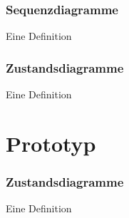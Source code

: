 \documentclass{beamer}
\begin{document}
\begin{frame} %
  \frametitle{Sequenzdiagramme} %
  \begin{Definition} %
    Eine Definition
  \end{Definition}
\end{frame}

\begin{frame} %
  \frametitle{Zustandsdiagramme} %
  \begin{Definition} %
    Eine Definition
  \end{Definition}
\end{frame}

\section{Prototyp}
\begin{frame} %
  \frametitle{Zustandsdiagramme} %
  \begin{Definition} %
    Eine Definition
  \end{Definition}
\end{frame}
\end{document}
